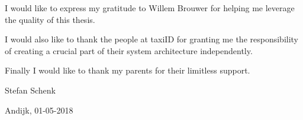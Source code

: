 
\begin{acknowledgements}

	I would like to express my gratitude to Willem Brouwer for helping me leverage the quality of this thesis.

	I would also like to thank the people at taxiID for granting me the responsibility of creating a crucial part of their system architecture independently.

	Finally I would like to thank my parents for their limitless support.

  Stefan Schenk

  Andijk, 01-05-2018

\end{acknowledgements}
